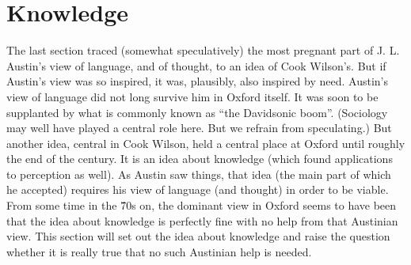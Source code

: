 \section{Knowledge} %
\label{sec:knowledge}

The last section traced (somewhat speculatively) the most pregnant part of J. L. Austin's view of language, and of thought, to an idea of Cook Wilson's. But if Austin's view was so inspired, it was, plausibly, also inspired by need. Austin’s view of language did not long survive him in Oxford itself. It was soon to be supplanted by what is commonly known as ``the Davidsonic boom''. (Sociology may well have played a central role here. But we refrain from speculating.) But another idea, central in Cook Wilson, held a central place at Oxford until roughly the end of the century. It is an idea about knowledge (which found applications to perception as well). As Austin saw things, that idea (the main part of which he accepted) requires his view of language (and thought) in order to be viable. From some time in the \'70s on, the dominant view in Oxford seems to have been that the idea about knowledge is perfectly fine with no help from that Austinian view. This section will set out the idea about knowledge and raise the question whether it is really true that no such Austinian help is needed.

